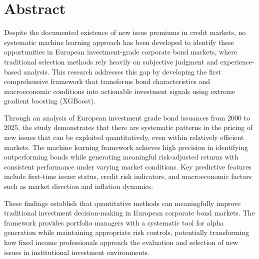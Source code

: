 \chapter*{Abstract}
\thispagestyle{empty} %

Despite the documented existence of new issue premiums in credit markets, no systematic machine learning approach has been developed to identify these opportunities in European investment-grade corporate bond markets, where traditional selection methods rely heavily on subjective judgment and experience-based analysis. This research addresses this gap by developing the first comprehensive framework that transforms bond characteristics and macroeconomic conditions into actionable investment signals using extreme gradient boosting (XGBoost).

Through an analysis of European investment grade bond issuances from 2000 to 2025, the study demonstrates that there are systematic patterns in the pricing of new issues that can be exploited quantitatively, even within relatively efficient markets. The machine learning framework achieves high precision in identifying outperforming bonds while generating meaningful risk-adjusted returns with consistent performance under varying market conditions. Key predictive features include first-time issuer status, credit risk indicators, and macroeconomic factors such as market direction and inflation dynamics.

These findings establish that quantitative methods can meaningfully improve traditional investment decision-making in European corporate bond markets. The framework provides portfolio managers with a systematic tool for alpha generation while maintaining appropriate risk controls, potentially transforming how fixed income professionals approach the evaluation and selection of new issues in institutional investment environments.